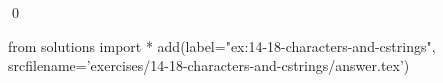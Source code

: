 
\begin{ex}
  \label{ex:14-18-characters-and-cstrings}
  
  \qed
\end{ex}
\begin{python0}
from solutions import *
add(label="ex:14-18-characters-and-cstrings",
    srcfilename='exercises/14-18-characters-and-cstrings/answer.tex')
\end{python0}
